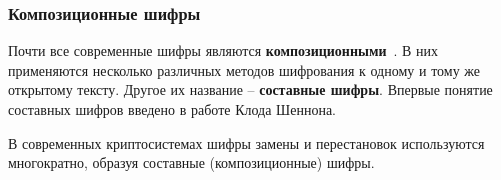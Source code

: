 \subsubsection{Композиционные шифры}

Почти все современные шифры являются \textbf{композиционными}~\cite{AlZKCh:2001}. В них применяются несколько различных методов шифрования к одному и тому же открытому тексту. Другое их название -- \textbf{составные шифры}. Впервые понятие составных шифров введено в работе Клода Шеннона.

В современных криптосистемах шифры замены и перестановок используются многократно, образуя составные (композиционные) шифры.


